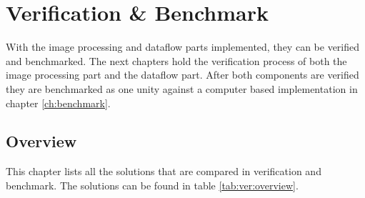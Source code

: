 %
%
\chapter{Verification \& Benchmark} \label{chapt:ver_bench}
With the image processing and dataflow parts implemented, they can be verified
and benchmarked. The next chapters hold the verification process of both the
image processing part and the dataflow part. After both components are verified
they are benchmarked as one unity against a computer based implementation in
chapter \ref{ch:benchmark}.

%
%
\section{Overview} \label{ch:overview}
This chapter lists all the solutions that are compared in verification and benchmark. The solutions can be found in table \ref{tab:ver:overview}.


